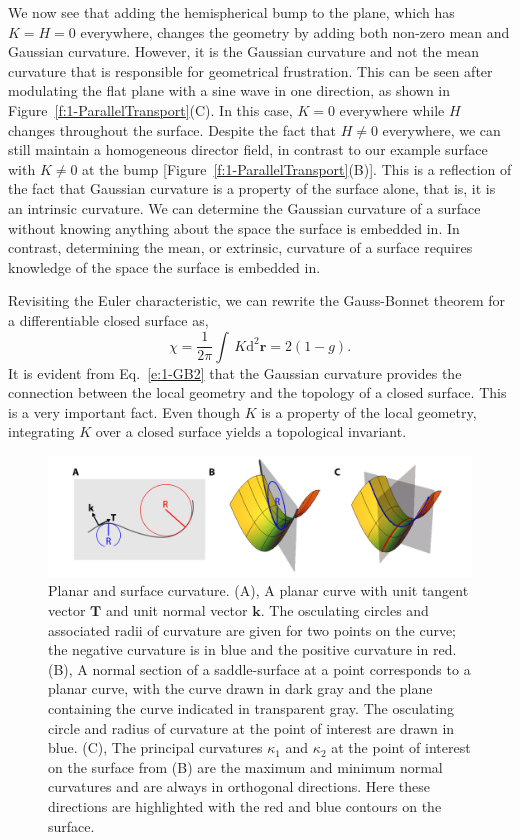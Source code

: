 We now see that adding the hemispherical bump to the plane, which has $K = H = 0$ everywhere, changes the geometry by adding both non-zero mean and Gaussian curvature.
However, it is the Gaussian curvature and not the mean curvature that is responsible for geometrical frustration.
This can be seen after modulating the flat plane with a sine wave in one direction, as shown in Figure~\ref{f:1-ParallelTransport}(C).
In this case, $K=0$ everywhere while $H$ changes throughout the surface.
Despite the fact that $H \neq 0$ everywhere, we can still maintain a homogeneous director field, in contrast to our example surface with $K \neq 0$ at the bump [Figure~\ref{f:1-ParallelTransport}(B)].
This is a reflection of the fact that Gaussian curvature is a property of the surface alone, that is, it is an intrinsic curvature.
We can determine the Gaussian curvature of a surface without knowing anything about the space the surface is embedded in.
In contrast, determining the mean, or extrinsic, curvature of a surface requires knowledge of the space the surface is embedded in.

Revisiting the Euler characteristic, we can rewrite the Gauss-Bonnet theorem for a differentiable closed surface as,
\begin{equation}
  \chi = \frac{1}{2 \pi} \int \, K \textrm{d}^2\mathbf{r} = 2(1-g)\label{e:1-GB2}.
\end{equation}
It is evident from Eq.~\ref{e:1-GB2} that the Gaussian curvature provides the connection between the local geometry and the topology of a closed surface.
This is a very important fact.
Even though $K$ is a property of the local geometry, integrating $K$ over a closed surface yields a topological invariant.
\begin{figure}
  \centering
  \includegraphics{figures/C1/Ch1-Figs_Curvature.png}
  \caption{Planar and surface curvature.
  (A), A planar curve with unit tangent vector $\mathbf{T}$ and unit normal vector $\mathbf{k}$. The osculating circles and associated radii of curvature are given for two points on the curve; the negative curvature is in blue and the positive curvature in red.
  (B), A normal section of a saddle-surface at a point corresponds to a planar curve, with the curve drawn in dark gray and the plane containing the curve indicated in transparent gray.
  The osculating circle and radius of curvature at the point of interest are drawn in blue.
  (C), The principal curvatures $\kappa_1$ and $\kappa_2$ at the point of interest on the surface from (B) are the maximum and minimum normal curvatures and are always in orthogonal directions. Here these directions are highlighted with the red and blue contours on the surface.}\label{f:1-Curvature}
\end{figure}

